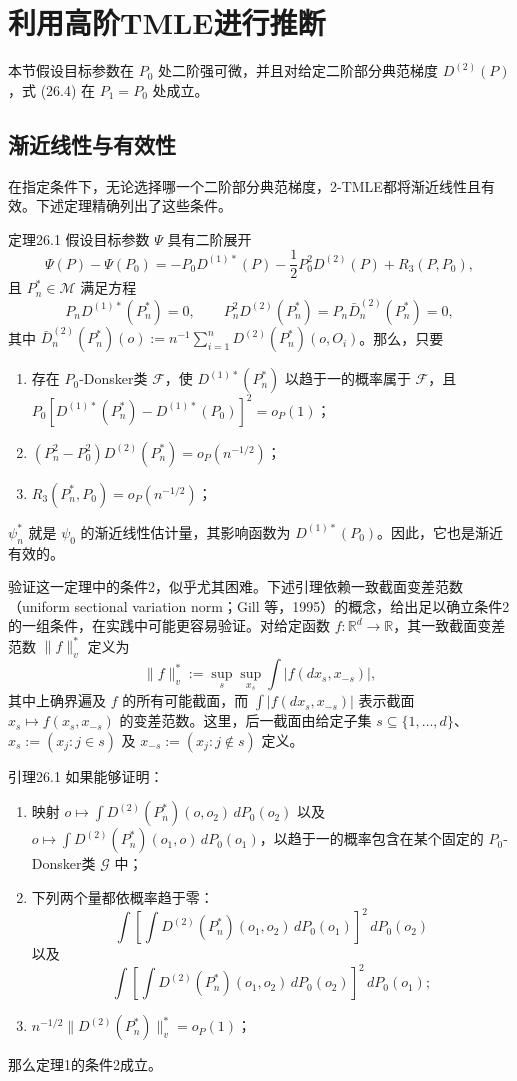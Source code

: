 \section{利用高阶TMLE进行推断}

本节假设目标参数在 $P_0$ 处二阶强可微，并且对给定二阶部分典范梯度 $D^{(2)}(P)$，式 (26.4) 在 $P_1=P_0$ 处成立。

\subsection{渐近线性与有效性}

在指定条件下，无论选择哪一个二阶部分典范梯度，2-TMLE都将渐近线性且有效。下述定理精确列出了这些条件。

\begin{bookresult}{定理}{26.1}
假设目标参数 $\Psi$ 具有二阶展开
\[
\Psi(P)-\Psi(P_0)=-P_0D^{(1)*}(P)-\frac12P_0^2D^{(2)}(P)+R_3(P,P_0),
\]
且 $P_n^*\in\mathcal M$ 满足方程
\[
P_nD^{(1)*}(P_n^*)=0,\qquad
P_n^2D^{(2)}(P_n^*)=P_n\bar D_n^{(2)}(P_n^*)=0,
\]
其中 $\bar D_n^{(2)}(P_n^*)(o):=n^{-1}\sum_{i=1}^nD^{(2)}(P_n^*)(o,O_i)$。那么，只要
\begin{enumerate}
\item 存在 $P_0$-Donsker类 $\mathcal F$，使 $D^{(1)*}(P_n^*)$ 以趋于一的概率属于 $\mathcal F$，且 $P_0[D^{(1)*}(P_n^*)-D^{(1)*}(P_0)]^2=o_P(1)$；
\item $(P_n^2-P_0^2)D^{(2)}(P_n^*)=o_P(n^{-1/2})$；
\item $R_3(P_n^*,P_0)=o_P(n^{-1/2})$；
\end{enumerate}
$\psi_n^*$ 就是 $\psi_0$ 的渐近线性估计量，其影响函数为 $D^{(1)*}(P_0)$。因此，它也是渐近有效的。
\end{bookresult}

验证这一定理中的条件2，似乎尤其困难。下述引理依赖一致截面变差范数（uniform sectional variation norm；Gill 等，1995）的概念，给出足以确立条件2的一组条件，在实践中可能更容易验证。对给定函数 $f:\mathbb R^d\to\mathbb R$，其一致截面变差范数 $\|f\|_v^*$ 定义为
\[
\|f\|_v^*:=\sup_s\sup_{x_s}\int|f(dx_s,x_{-s})|,
\]
其中上确界遍及 $f$ 的所有可能截面，而 $\int|f(dx_s,x_{-s})|$ 表示截面 $x_s\mapsto f(x_s,x_{-s})$ 的变差范数。这里，后一截面由给定子集 $s\subseteq\{1,\ldots,d\}$、$x_s:=(x_j:j\in s)$ 及 $x_{-s}:=(x_j:j\notin s)$ 定义。

\begin{bookresult}{引理}{26.1}
如果能够证明：
\begin{enumerate}
\item 映射 $o\mapsto\int D^{(2)}(P_n^*)(o,o_2)\,dP_0(o_2)$ 以及 $o\mapsto\int D^{(2)}(P_n^*)(o_1,o)\,dP_0(o_1)$，以趋于一的概率包含在某个固定的 $P_0$-Donsker类 $\mathcal G$ 中；
\item 下列两个量都依概率趋于零：
\[
\int\left[\int D^{(2)}(P_n^*)(o_1,o_2)\,dP_0(o_1)\right]^2\,dP_0(o_2)
\]
以及
\[
\int\left[\int D^{(2)}(P_n^*)(o_1,o_2)\,dP_0(o_2)\right]^2\,dP_0(o_1);
\]
\item $n^{-1/2}\|D^{(2)}(P_n^*)\|_v^*=o_P(1)$；
\end{enumerate}
那么定理1的条件2成立。
\end{bookresult}

